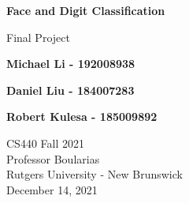 \documentclass[11pt]{article}
\begin{document}
    \begin{titlepage}
        \begin{center}
            \vspace{1cm}

            \Huge
            \textbf{Face and Digit Classification}

            \vspace{0.5cm}
            \LARGE
            Final Project

            \vspace{1cm}

            \textbf{Michael Li - 192008938}

            \textbf{Daniel Liu - 184007283}

            \textbf{Robert Kulesa - 185009892}


            \vfill


            \vspace{0.8cm}

            \Large
            CS440 Fall 2021\\
            Professor Boularias\\
            Rutgers University - New Brunswick\\
            December 14, 2021

        \end{center}
    \end{titlepage}
\end{document}
